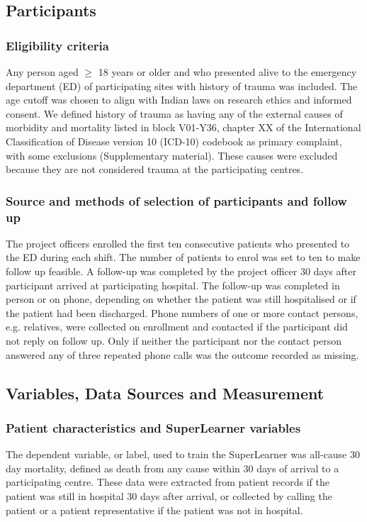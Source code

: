 \documentclass[10pt,letterpaper]{article}\usepackage[]{graphicx}\usepackage[]{color}
\begin{document}
\subsection*{Participants}
\subsubsection*{Eligibility criteria}
Any person aged $\geq$ 18 years or older and who presented alive to the
emergency department (ED) of participating sites with history of trauma was
included. The age cutoff was chosen to align with Indian laws on research ethics
and informed consent. We defined history of trauma as having any of the external
causes of morbidity and mortality listed in block V01-Y36, chapter XX of the
International Classification of Disease version 10 (ICD-10) codebook as primary
complaint, with some exclusions (Supplementary material). These causes were
excluded because they are not considered trauma at the participating centres.

\subsubsection*{Source and methods of selection of participants and follow up}
The project officers enrolled the first ten consecutive patients who presented
to the ED during each shift. The number of patients to enrol was set to ten to
make follow up feasible. A follow-up was completed by the project officer 30
days after participant arrived at participating hospital. The follow-up was
completed in person or on phone, depending on whether the patient was still
hospitalised or if the patient had been discharged. Phone numbers of one or more
contact persons, e.g. relatives, were collected on enrollment and contacted if
the participant did not reply on follow up. Only if neither the participant nor
the contact person answered any of three repeated phone calls was the outcome
recorded as missing.

\subsection*{Variables, Data Sources and Measurement}
\subsubsection*{Patient characteristics and SuperLearner variables}
The dependent variable, or label, used to train the SuperLearner was all-cause
30 day mortality, defined as death from any cause within 30 days of arrival to a
participating centre. These data were extracted from patient records if the
patient was still in hospital 30 days after arrival, or collected by calling the
patient or a patient representative if the patient was not in hospital.
\end{document}
